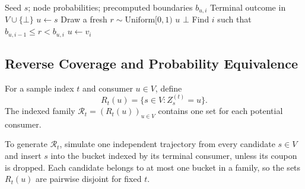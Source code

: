\documentclass[sigconf]{acmart}
\begin{document}
\begin{algorithm}[t]
\caption{\textsc{SampleTerminalConsumer}$(s)$}
\label{alg:kernel}
\begin{algorithmic}[1]
\Require Seed $s$; node probabilities; precomputed boundaries $b_{u,i}$
\Ensure Terminal outcome in $V\cup\{\bot\}$
\State $u\gets s$
  \State Draw a fresh $r\sim\mathrm{Uniform}[0,1)$
    \State \Return $u$
    \State \Return $\bot$
  \Else
    \State Find $i$ such that $b_{u,i-1}\le r<b_{u,i}$
    \State $u\gets v_i$
  \EndIf
\EndWhile
\end{algorithmic}
\end{algorithm}

\subsection{Reverse Coverage and Probability Equivalence}
\label{sec:reverse-coverage}

\begin{definition}
For a sample index $t$ and consumer $u\in V$, define
\begin{equation}
\label{eq:reverse-set-def}
  R_t(u)=\{s\in V:Z_s^{(t)}=u\}.
\end{equation}
The indexed family $\mathcal R_t=(R_t(u))_{u\in V}$ contains one
set for each potential consumer.
\end{definition}

To generate $\mathcal R_t$, simulate one independent trajectory
from every candidate $s\in V$ and insert $s$ into the bucket
indexed by its terminal consumer, unless its coupon is dropped.
Each candidate belongs to at most one bucket in a family, so the
sets $R_t(u)$ are pairwise disjoint for fixed $t$.
\end{document}

